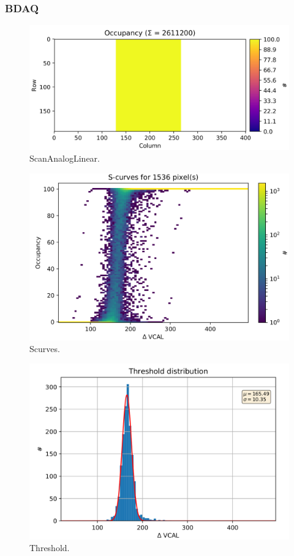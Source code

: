 \subsubsection{BDAQ}
\begin{figure}
\centering
\includegraphics[width=\textwidth]{Immagini/ScanAnalogLinear}
\caption{ ScanAnalogLinear.}
\label{ScanAnalogLinear}
\end{figure}
\begin{figure}
\centering
\includegraphics[width=\textwidth]{Immagini/Scurves}
\caption{Scurves.}
\label{Scurves}
\end{figure}
\begin{figure}
\centering
\includegraphics[width=\textwidth]{Immagini/Threshold}
\caption{Threshold.}
\label{Threshold}
\end{figure}
